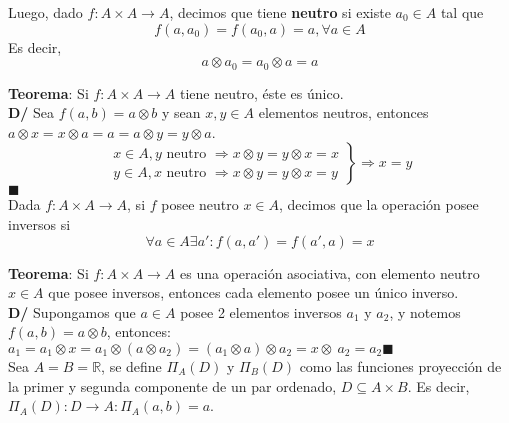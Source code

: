 \documentclass[11pt,a4paper]{article}
\newcommand*{\QEDA}{\null\nobreak\hfill\ensuremath{\blacksquare}}
\begin{document}
\noindent Luego, dado $f : A \times A \rightarrow A$, decimos que tiene \textbf{neutro} si existe $a_0 \in A$ tal que $$f(a, a_0) = f(a_0, a) = a, \forall a \in A$$
\noindent Es decir, $$a \otimes a_0 = a_0 \otimes a = a$$

\noindent \textbf{Teorema}: Si $f : A \times A \rightarrow A$ tiene neutro, \'este es \'unico.\\
\textbf{D/} Sea $f(a,b) = a \otimes b$ y sean $x,y \in A$ elementos neutros, entonces $a \otimes x = x \otimes a = a = a \otimes y = y \otimes a$.
\[ \left. \begin{array}{l}
x \in A, y \text{ neutro } \Rightarrow x \otimes y = y \otimes x = x\\
y \in A, x \text{ neutro } \Rightarrow x \otimes y = y \otimes x = y
\end{array} \right\} \Rightarrow x = y\]  \QEDA\\

\noindent Dada $f : A \times A \rightarrow A$, si $f$ posee neutro $x \in A$, decimos que la operaci\'on posee inversos si $$\forall a \in A \exists a' : f(a, a') = f(a', a) = x$$

\noindent \textbf{Teorema}: Si $f : A \times A \rightarrow A$ es una operaci\'on asociativa, con elemento neutro $x \in A$ que posee inversos, entonces cada elemento posee un \'unico inverso.\\
\textbf{D/} Supongamos que $a \in A$ posee 2 elementos inversos $a_1$ y $a_2$, y notemos $f(a,b) = a \otimes b$, entonces: \\ $a_1 = a_1 \otimes x = a_1 \otimes (a \otimes a_2) = (a_1 \otimes a) \otimes a_2 = x \otimes\ a_2 = a_2$\QEDA\\

\noindent Sea $A = B = \mathbb{R}$, se define $\Pi_A(D)$ y $\Pi_B(D)$ como las funciones proyecci\'on de la primer y segunda componente de un par ordenado, $D \subseteq A \times B$. Es decir, $\Pi_A(D) : D \rightarrow A : \Pi_A(a,b) = a$.
\end{document}
